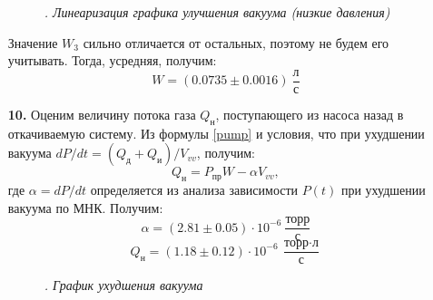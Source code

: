 \documentclass[a4paper]{article}
\begin{document}
\begin{itemize}
\begin{figure}
\caption{\textit{. Линеаризация графика улучшения вакуума (низкие давления)}}
\end{figure}

\noindent
Значение $W_3$ сильно отличается от остальных, поэтому не будем его учитывать. Тогда, усредняя, получим:
\[W = (0.0735 \pm 0.0016) \ \frac{\text{л}}{\text{с}}\] 

\item[\textbf{10. }] Оценим величину потока газа $Q_{\text{н}}$, поступающего из насоса назад в откачиваемую систему. Из формулы \eqref{pump} и условия, что при ухудшении вакуума $dP/dt = (Q_{\text{д}} + Q_{\text{и}})/V_{vv}$, получим:
\[Q_{\text{н}} = P_{\text{пр}} W - \alpha V_{vv}, \]
где $\alpha = dP/dt$ определяется из анализа зависимости $P(t)$ при ухудшении вакуума по МНК. Получим:
\[\alpha = (2.81 \pm 0.05) \cdot 10^{-6} \ \frac{\text{торр}}{\text{с}} \]
\[Q_{\text{н}} = (1.18 \pm 0.12) \cdot 10^{-6} \ \frac{\text{торр} \cdot \text{л}}{\text{с}} \]

\begin{figure}
\caption{\textit{. График ухудшения вакуума}}
\end{figure}


\end{itemize}
\end{document}
